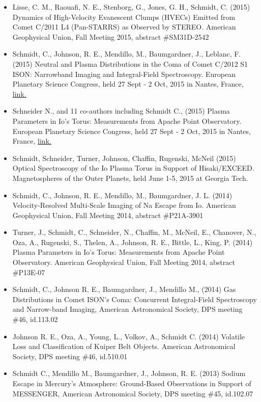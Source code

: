 \documentclass[12pt]{report}
\begin{document}
\begin{itemize}
   \item Lisse, C. M., Raouafi, N. E., Stenborg, G., Jones, G. H., Schmidt, C. (2015) Dynamics of High-Velocity Evanescent Clumps (HVECs) Emitted from Comet C/2011 L4 (Pan-STARRS) as Observed by STEREO. American Geophysical Union, Fall Meeting 2015, abstract \#SM31D-2542
   \item Schmidt, C., Johnson, R. E., Mendillo, M., Baumgardner, J., Leblanc, F. (2015) Neutral and Plasma Distributions in the Coma of Comet C/2012 S1 ISON: Narrowband Imaging and Integral-Field Spectroscopy. European Planetary Science Congress, held 27 Sept - 2 Oct, 2015 in Nantes, France, \href{https://meetingorganizer.copernicus.org/EPSC2015/EPSC2015-315-2.pdf}{link.} 
   \item Schneider N., and 11 co-authors including Schmidt C., (2015) Plasma Parameters in Io's Torus: Measurements from Apache Point Observatory. European Planetary Science Congress, held 27 Sept - 2 Oct, 2015 in Nantes, France, \href{https://meetingorganizer.copernicus.org/EPSC2015/EPSC2015-418-1.pdf}{link.} 
   \item Schmidt, Schneider, Turner, Johnson, Chaffin, Rugenski, McNeil (2015) Optical Spectroscopy of the Io Plasma Torus in Support of Hisaki/EXCEED. Magnetospheres of the Outer Planets, held June 1-5, 2015 at Georgia Tech.
   \item Schmidt, C., Johnson, R. E., Mendillo, M., Baumgardner, J. L. (2014) Velocity-Resolved Multi-Scale Imaging of Na Escape from Io. American Geophysical Union, Fall Meeting 2014, abstract \#P21A-3901
   \item Turner, J., Schmidt, C., Schneider, N., Chaffin, M., McNeil, E., Chanover, N., Oza, A., Rugenski, S., Thelen, A., Johnson, R. E., Bittle, L., King, P. (2014) Plasma Parameters in Io's Torus: Measurements from Apache Point Observatory. American Geophysical Union, Fall Meeting 2014, abstract \#P13E-07
   \item Schmidt, C., Johnson R. E., Baumgardner, J., Mendillo M., (2014) Gas Distributions in Comet ISON's Coma: Concurrent Integral-Field Spectroscopy and Narrow-band Imaging, American Astronomical Society, DPS meeting \#46, id.113.02
   \item Johnson R. E., Oza, A., Young, L., Volkov, A., Schmidt C. (2014) Volatile Loss and Classification of Kuiper Belt Objects. American Astronomical Society, DPS meeting \#46, id.510.01
   \item Schmidt C.,  Mendillo M., Baumgardner, J., Johnson, R. E. (2013) Sodium Escape in Mercury's Atmosphere: Ground-Based Observations in Support of MESSENGER, American Astronomical Society, DPS meeting \#45, id.102.07

\end{itemize}
\end{document}
